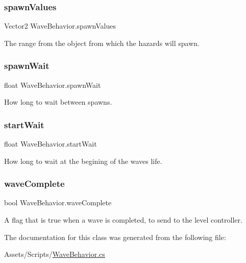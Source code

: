 \mbox{\label{class_wave_behavior_ae26807be7d4406478efc4886aa610189}} 
\subsubsection{\texorpdfstring{spawnValues}{spawnValues}}
{\footnotesize\ttfamily Vector2 Wave\+Behavior.\+spawn\+Values}



The range from the object from which the hazards will spawn. 

\mbox{\label{class_wave_behavior_a401c9221c61cc6b50bc1d538b5365555}} 
\subsubsection{\texorpdfstring{spawnWait}{spawnWait}}
{\footnotesize\ttfamily float Wave\+Behavior.\+spawn\+Wait}



How long to wait between spawns. 

\mbox{\label{class_wave_behavior_ae8cd1f5cb102b67698fd4043bf2314d2}} 
\subsubsection{\texorpdfstring{startWait}{startWait}}
{\footnotesize\ttfamily float Wave\+Behavior.\+start\+Wait}



How long to wait at the begining of the wave\textquotesingle{}s life. 

\mbox{\label{class_wave_behavior_a32d9c8126e7d2cf877476eca635f50c6}} 
\subsubsection{\texorpdfstring{waveComplete}{waveComplete}}
{\footnotesize\ttfamily bool Wave\+Behavior.\+wave\+Complete}



A flag that is true when a wave is completed, to send to the level controller. 



The documentation for this class was generated from the following file\+:\begin{DoxyCompactItemize}
\item 
Assets/\+Scripts/\mbox{\hyperlink{_wave_behavior_8cs}{Wave\+Behavior.\+cs}}\end{DoxyCompactItemize}
